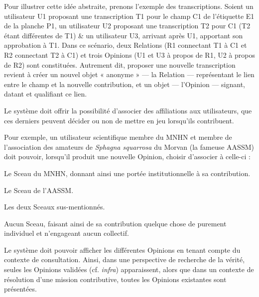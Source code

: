 Pour illustrer cette idée abstraite, prenons l'exemple des transcriptions.
Soient un utilisateur U1 proposant une transcription T1 pour le champ C1 de l'étiquette E1 de la planche P1, un utilisateur U2 proposant une transcription T2 pour C1 (T2 étant différentes de T1) & un utilisateur U3, arrivant après U1, apportant son approbation à T1.
Dans ce scénario, deux Relations (R1 connectant T1 à C1 et R2 connectant T2 à C1) et trois Opinions (U1 et U3 à propos de R1, U2 à propos de R2) sont constituées.
Autrement dit, proposer une nouvelle transcription revient à créer un nouvel objet « anonyme » --- la Relation --- représentant le lien entre le champ et la nouvelle contribution, et un objet --- l'Opinion --- signant, datant et qualifiant ce lien.

\startsubsection[title={Notion de Sceau}]

\fon{} Le système doit offrir la possibilité d'associer des affiliations aux utilisateurs, que ces derniers peuvent décider ou non de mettre en jeu lorsqu'ils contribuent.

Pour exemple, un utilisateur scientifique membre du MNHN et membre de l'association des amateurs de {\it Sphagna squarrosa} du Morvan (la fameuse AASSM) doit pouvoir, lorsqu'il produit une nouvelle Opinion, choisir d'associer à celle-ci :

\startitemize
	\item Le Sceau du MNHN, donnant ainsi une portée institutionnelle à sa contribution.
	\item Le Sceau de l'AASSM.
	\item Les deux Sceaux sus-mentionnés.
	\item Aucun Sceau, faisant ainsi de sa contribution quelque chose de purement individuel et n'engageant aucun collectif.
\stopitemize

\startsubsection[title={Présentation des Opinions}]

\fon{} Le système doit pouvoir afficher les différentes Opinions en tenant compte du contexte de consultation. Ainsi, dans une perspective de recherche de la vérité, seules les Opinions validées (cf. {\it infra}) apparaissent, alors que dans un contexte de résolution d'une mission contributive, toutes les Opinions existantes sont présentées.

\startsection[title={Fournir la donnée la plus pertinente}]

